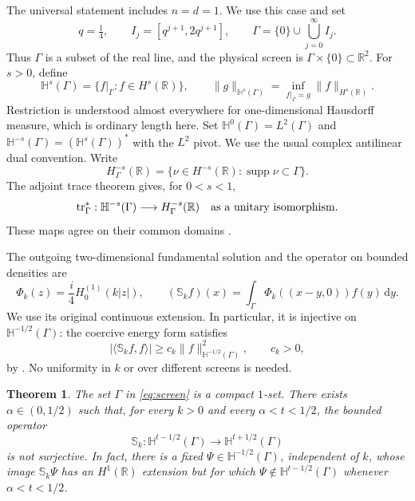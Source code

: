 \documentclass[11pt]{article}
\newtheorem{theorem}{Theorem}[section]
\newcommand{\hH}{\mathbb H}
\newcommand{\R}{\mathbb R}
\newcommand{\tr}{\operatorname{tr}}
\newcommand{\supp}{\operatorname{supp}}
\newcommand{\dd}{\,\mathrm d}
\begin{document}
The universal statement includes \(n=d=1\). We use this case and set
\begin{equation}\label{eq:screen}
 q=\tfrac14,\qquad I_j=[q^{j+1},2q^{j+1}],\qquad
 \Gamma=\{0\}\cup\bigcup_{j=0}^{\infty}I_j .
\end{equation}
Thus \(\Gamma\) is a subset of the real line, and the physical screen is
\(\Gamma\times\{0\}\subset\R^2\). For \(s>0\), define
\[
 \hH^s(\Gamma)=\{f|_\Gamma:f\in H^s(\R)\},\qquad
 \|g\|_{\hH^s(\Gamma)}
   =\inf_{f|_\Gamma=g}\|f\|_{H^s(\R)} .
\]
Restriction is understood almost everywhere for one-dimensional Hausdorff
measure, which is ordinary length here. Set
\(\hH^0(\Gamma)=L^2(\Gamma)\) and
\(\hH^{-s}(\Gamma)=(\hH^s(\Gamma))^*\) with the \(L^2\) pivot.
We use the usual complex antilinear dual convention.
Write
\[
 H^{-s}_\Gamma(\R)=
   \{\nu\in H^{-s}(\R):\supp\nu\subset\Gamma\}.
\]
The adjoint trace theorem \cite[Theorem 2.7]{CGH} gives, for \(0<s<1\),
\begin{equation}\label{eq:trace-adjoint}
 \tr_\Gamma^*:\hH^{-s}(\Gamma)
       \longrightarrow H^{-s}_\Gamma(\R)
 \quad\hbox{as a unitary isomorphism}.
\end{equation}
These maps agree on their common domains
\cite[Section 2.4, footnote 7]{CGH}.

The outgoing two-dimensional fundamental solution and the operator on
bounded densities are
\begin{equation}\label{eq:helmholtz}
 \Phi_k(z)=\frac{i}{4}H_0^{(1)}(k|z|),\qquad
 (\mathbb S_k f)(x)=
   \int_\Gamma\Phi_k((x-y,0))f(y)\dd y .
\end{equation}
We use its original continuous extension. In particular, it is injective
on \(\hH^{-1/2}(\Gamma)\): the coercive energy form satisfies
\begin{equation}\label{eq:coercive}
 |\langle\mathbb S_k f,f\rangle|
       \ge c_k\|f\|_{\hH^{-1/2}(\Gamma)}^2,\qquad c_k>0,
\end{equation}
by \cite[Lemma 4.3 and equations (45)--(46)]{CGH}.
No uniformity in \(k\) or over different screens is needed.

\begin{theorem}\label{thm:main}
The set \(\Gamma\) in \eqref{eq:screen} is a compact \(1\)-set.
There exists \(\alpha\in(0,1/2)\) such that, for every \(k>0\) and
every \(\alpha<t<1/2\), the bounded operator
\[
 \mathbb S_k:\hH^{t-1/2}(\Gamma)\longrightarrow
                    \hH^{t+1/2}(\Gamma)
\]
is not surjective. In fact, there is a fixed
\(\Psi\in\hH^{-1/2}(\Gamma)\), independent of \(k\), whose image
\(\mathbb S_k\Psi\) has an \(H^1(\R)\) extension but for which
\(\Psi\notin\hH^{t-1/2}(\Gamma)\) whenever \(\alpha<t<1/2\).
\end{theorem}
\end{document}
